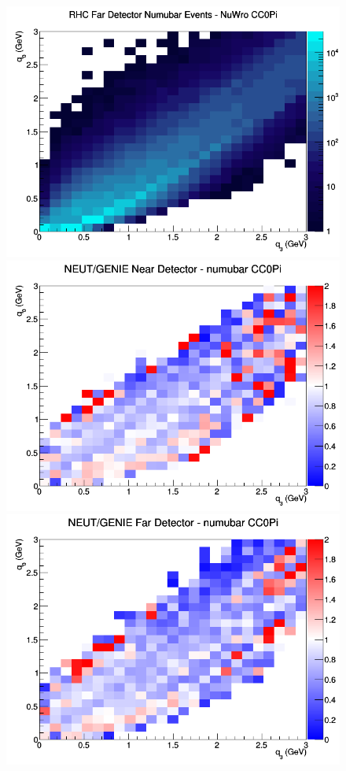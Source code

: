 \begin{figure}[h]
\endminipage
{}
\includegraphics[width=\linewidth]{eff_q0_q3/FGT/CC0Pi_RHC_FD_numubar_q3_q0_NuWro.png}
\endminipage
\newline
{}
\includegraphics[width=\linewidth]{eff_q0_q3/FGT/ratios/CC0Pi_NEUT_GENIE_numubar_near_q3_q0.png}
\endminipage
{}
\includegraphics[width=\linewidth]{eff_q0_q3/FGT/ratios/CC0Pi_NEUT_GENIE_numubar_far_q3_q0.png}

\end{figure}
